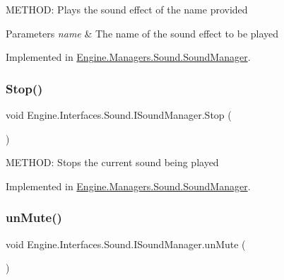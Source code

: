 M\+E\+T\+H\+OD\+: Plays the sound effect of the name provided 


\begin{DoxyParams}{Parameters}
{\em name} & The name of the sound effect to be played\\
\hline
\end{DoxyParams}


Implemented in \hyperlink{a00546_a6613813ccd38703484e80ca8775ecdf8}{Engine.\+Managers.\+Sound.\+Sound\+Manager}.

\mbox{\label{a00482_ac47a91d3e28a8f7a1e5348fb6eff50e2}} 
\subsubsection{\texorpdfstring{Stop()}{Stop()}}
{\footnotesize\ttfamily void Engine.\+Interfaces.\+Sound.\+I\+Sound\+Manager.\+Stop (\begin{DoxyParamCaption}{ }\end{DoxyParamCaption})}



M\+E\+T\+H\+OD\+: Stops the current sound being played 



Implemented in \hyperlink{a00546_a0d3222475855f63b0c8f9dbe9b52e7f7}{Engine.\+Managers.\+Sound.\+Sound\+Manager}.

\mbox{\label{a00482_a59c011a4cf667d6e967bddad50c7cb2f}} 
\subsubsection{\texorpdfstring{un\+Mute()}{unMute()}}
{\footnotesize\ttfamily void Engine.\+Interfaces.\+Sound.\+I\+Sound\+Manager.\+un\+Mute (\begin{DoxyParamCaption}{ }\end{DoxyParamCaption})}



